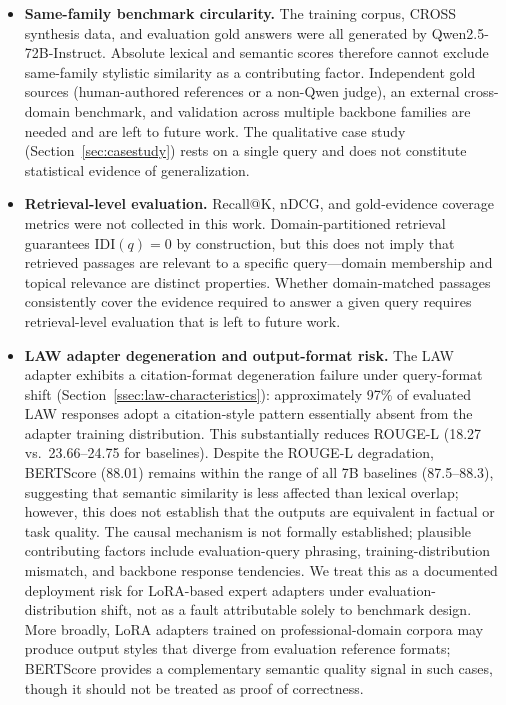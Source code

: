 \documentclass[a4paper,fleql,doubleblind]{cas-sc}
\begin{document}
\begin{itemize}
\item \textbf{Same-family benchmark circularity.}
The training corpus, CROSS synthesis data, and evaluation gold answers were
all generated by Qwen2.5-72B-Instruct. Absolute lexical and semantic scores
therefore cannot exclude same-family stylistic similarity as a contributing
factor. Independent gold sources (human-authored references or a non-Qwen
judge), an external cross-domain benchmark, and validation across multiple
backbone families are needed and are left to future work. The qualitative
case study (Section~\ref{sec:casestudy})
rests on a single query and does not constitute statistical evidence of
generalization.

\item \textbf{Retrieval-level evaluation.}
Recall@K, nDCG, and gold-evidence coverage metrics were not collected in this
work. Domain-partitioned retrieval guarantees $\mathrm{IDI}(q){=}0$ by
construction, but this does not imply that retrieved passages are relevant to
a specific query---domain membership and topical relevance are distinct
properties. Whether domain-matched passages consistently cover the evidence
required to answer a given query requires retrieval-level evaluation that is
left to future work.

\item \textbf{LAW adapter degeneration and output-format risk.}
The LAW adapter exhibits a citation-format degeneration failure under query-format
shift (Section~\ref{ssec:law-characteristics}): approximately 97\% of evaluated
LAW responses adopt a citation-style pattern essentially absent from the adapter
training distribution.
This substantially reduces ROUGE-L (18.27 vs.\ 23.66--24.75 for baselines).
Despite the ROUGE-L degradation, BERTScore (88.01) remains within the range of
all 7B baselines (87.5--88.3), suggesting that semantic similarity is less
affected than lexical overlap; however, this does not establish that the outputs
are equivalent in factual or task quality.
The causal mechanism is not formally established; plausible contributing factors
include evaluation-query phrasing, training-distribution mismatch, and backbone
response tendencies.
We treat this as a documented deployment risk for LoRA-based expert adapters
under evaluation-distribution shift, not as a fault attributable solely to
benchmark design.
More broadly, LoRA adapters trained on professional-domain corpora may produce
output styles that diverge from evaluation reference formats; BERTScore provides
a complementary semantic quality signal in such cases, though it should not be
treated as proof of correctness.


\end{itemize}
\end{document}
